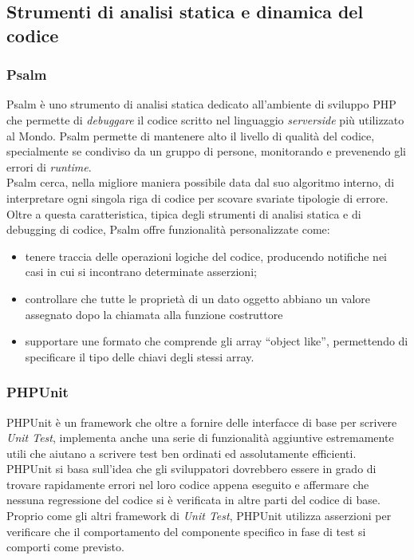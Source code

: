 \subsection{Strumenti di analisi statica e dinamica del codice}
\subsubsection{Psalm}
Psalm è uno strumento di analisi statica dedicato all'ambiente di sviluppo PHP che permette di \textit{debuggare} il codice scritto nel linguaggio \textit{serverside} più utilizzato al Mondo. Psalm permette di mantenere alto il livello di qualità del codice, specialmente se condiviso da un gruppo di persone, monitorando e prevenendo gli errori di \textit{runtime}.
\\
Psalm cerca, nella migliore maniera possibile data dal suo algoritmo interno, di interpretare ogni singola riga di codice per scovare svariate tipologie di errore. Oltre a questa caratteristica, tipica degli strumenti di analisi statica e di debugging di codice, Psalm offre funzionalità personalizzate come:
\begin{itemize}
    \item tenere traccia delle operazioni logiche del codice, producendo notifiche nei casi in cui si incontrano determinate asserzioni;
    
    \item controllare che tutte le proprietà di un dato oggetto abbiano un valore assegnato dopo la chiamata alla funzione costruttore
    
    \item supportare une formato che comprende gli array “object like”, permettendo di specificare il tipo delle chiavi degli stessi array.
\end{itemize}

\subsubsection{PHPUnit}
PHPUnit è un framework che oltre a fornire delle interfacce di base per scrivere \textit{Unit Test}, implementa anche una serie di funzionalità aggiuntive estremamente utili che aiutano a scrivere test ben ordinati ed assolutamente efficienti.
\\
PHPUnit si basa sull'idea che gli sviluppatori dovrebbero essere in grado di trovare rapidamente errori nel loro codice appena eseguito e affermare che nessuna regressione del codice si è verificata in altre parti del codice di base. Proprio come gli altri framework di \textit{Unit Test}, PHPUnit utilizza asserzioni per verificare che il comportamento del componente specifico in fase di test si comporti come previsto.

